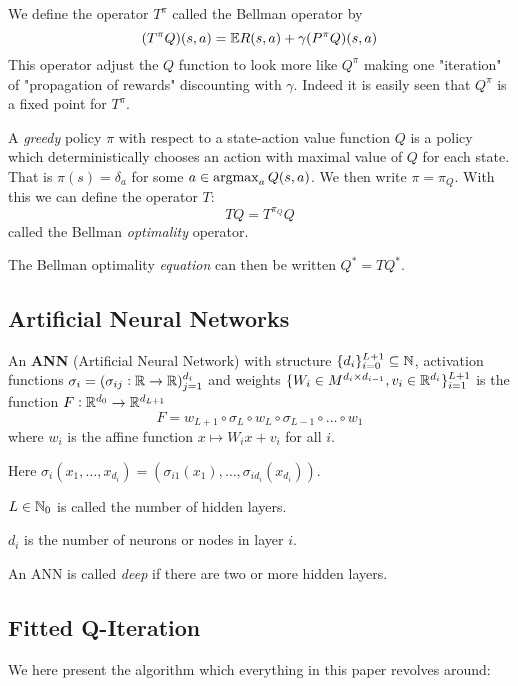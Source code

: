 We define the operator $T^\pi$ called the Bellman operator by
\[ (T^\pi Q)(s, a) = \mathbb{E} R(s, a) + \gamma (P^\pi Q)(s, a) \]
This operator adjust the $Q$ function to look more like $Q^\pi$ making one
"iteration" of "propagation of rewards" discounting with $\gamma$.
Indeed it is easily seen that $Q^\pi$ is a fixed point for $T^\pi$.

A \emph{greedy} policy $\pi$ with respect to a state-action value function $Q$
is a policy which deterministically chooses an action with maximal value of $Q$
for each state.
That is $\pi(s) = \delta_a$ for some $a \in \operatorname*{argmax}_a Q(s,a)$.
We then write $\pi = \pi_Q$. With this we can define the operator $T$:
\[ T Q = T^{\pi_Q} Q \]
called the Bellman \emph{optimality} operator.

The Bellman optimality \emph{equation} can then be written $Q^* = TQ^*$.



\subsection{Artificial Neural Networks}

\begin{defn}\label{def_ANN}
	An \textbf{ANN} (Artificial Neural Network) with structure
	$\{ d_i \}_{i=0}^{L+1} \subseteq \mathbb{N}$,
	activation functions $\sigma_i = (\sigma_{ij} : \mathbb{R} \to \mathbb{R})_{j=1}^{d_i}$
	and weights $\{ W_i \in M^{d_i \times d_{i-1}}, v_i \in \mathbb{R}^{d_i} \}_{i=1}^{L+1}$
	is the function $F:\mathbb{R}^{d_0} \to \mathbb{R}^{d_{L+1}}$ 
	\[ F = w_{L+1} \circ \sigma_L \circ w_L \circ \sigma_{L-1} \circ \dots \circ w_1 \]
	where $w_i$ is the affine function $x \mapsto W_i x + v_i$ for all $i$.

	Here $\sigma_i(x_1, \dots, x_{d_i})
	= (\sigma_{i1}(x_1), \dots, \sigma_{id_{i}}(x_{d_{i}}))$.

	$L \in \mathbb{N}_0$ is called the number of hidden layers.

	$d_i$ is the number of neurons or nodes in layer $i$.
\end{defn}

An ANN is called \emph{deep} if there are two or more hidden layers.

\subsection{Fitted Q-Iteration}

We here present the algorithm which everything in this paper revolves around:

